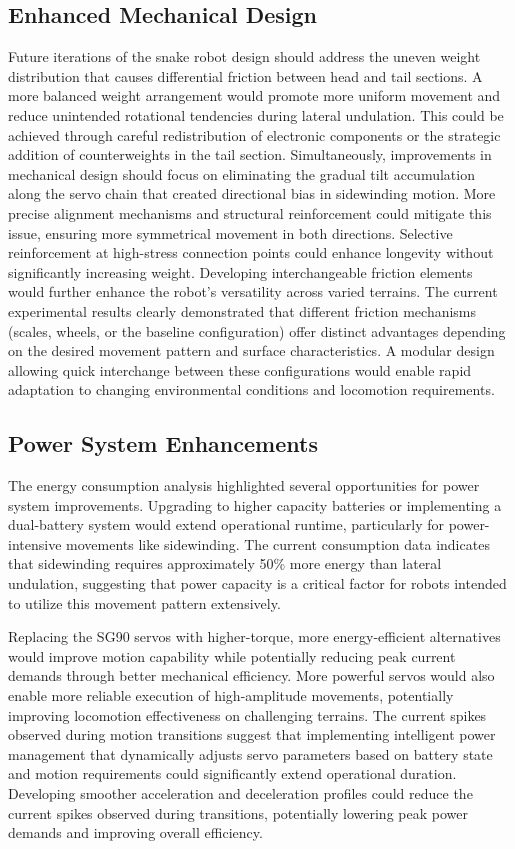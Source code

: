 \documentclass[12pt,a4paper]{report}
\begin{document}
\subsection{Enhanced Mechanical Design}
\label{subsec:mechanical_improvements}

Future iterations of the snake robot design should address the uneven weight distribution that causes differential friction between head and tail sections. A more balanced weight arrangement would promote more uniform movement and reduce unintended rotational tendencies during lateral undulation. This could be achieved through careful redistribution of electronic components or the strategic addition of counterweights in the tail section. Simultaneously, improvements in mechanical design should focus on eliminating the gradual tilt accumulation along the servo chain that created directional bias in sidewinding motion. More precise alignment mechanisms and structural reinforcement could mitigate this issue, ensuring more symmetrical movement in both directions.
Selective reinforcement at high-stress connection points could enhance longevity without significantly increasing weight.
Developing interchangeable friction elements would further enhance the robot's versatility across varied terrains. The current experimental results clearly demonstrated that different friction mechanisms (scales, wheels, or the baseline configuration) offer distinct advantages depending on the desired movement pattern and surface characteristics. A modular design allowing quick interchange between these configurations would enable rapid adaptation to changing environmental conditions and locomotion requirements.

\subsection{Power System Enhancements}
\label{subsec:power_improvements}

The energy consumption analysis highlighted several opportunities for power system improvements. Upgrading to higher capacity batteries or implementing a dual-battery system would extend operational runtime, particularly for power-intensive movements like sidewinding. The current consumption data indicates that sidewinding requires approximately 50\% more energy than lateral undulation, suggesting that power capacity is a critical factor for robots intended to utilize this movement pattern extensively.

Replacing the SG90 servos with higher-torque, more energy-efficient alternatives would improve motion capability while potentially reducing peak current demands through better mechanical efficiency. More powerful servos would also enable more reliable execution of high-amplitude movements, potentially improving locomotion effectiveness on challenging terrains. The current spikes observed during motion transitions suggest that implementing intelligent power management that dynamically adjusts servo parameters based on battery state and motion requirements could significantly extend operational duration.
Developing smoother acceleration and deceleration profiles could reduce the current spikes observed during transitions, potentially lowering peak power demands and improving overall efficiency. 
\end{document}
